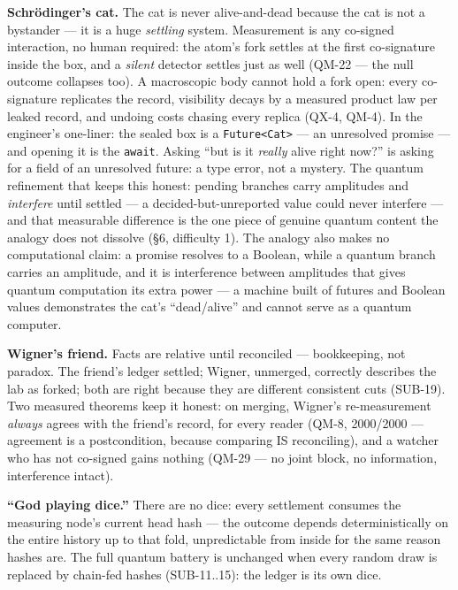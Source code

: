 \documentclass[
  11pt,
]{article}
\begin{document}
\textbf{Schrödinger's cat.} The cat is never alive-and-dead because the
cat is not a bystander --- it is a huge \emph{settling} system.
Measurement is any co-signed interaction, no human required: the atom's
fork settles at the first co-signature inside the box, and a
\emph{silent} detector settles just as well (QM-22 --- the null outcome
collapses too). A macroscopic body cannot hold a fork open: every
co-signature replicates the record, visibility decays by a measured
product law per leaked record, and undoing costs chasing every replica
(QX-4, QM-4). In the engineer's one-liner: the sealed box is a
\texttt{Future\textless{}Cat\textgreater{}} --- an unresolved promise
--- and opening it is the \texttt{await}. Asking ``but is it
\emph{really} alive right now?'' is asking for a field of an unresolved
future: a type error, not a mystery. The quantum refinement that keeps
this honest: pending branches carry amplitudes and \emph{interfere}
until settled --- a decided-but-unreported value could never interfere
--- and that measurable difference is the one piece of genuine quantum
content the analogy does not dissolve (\S{}6, difficulty 1). The analogy
also makes no computational claim: a promise resolves to a Boolean,
while a quantum branch carries an amplitude, and it is interference
between amplitudes that gives quantum computation its extra power --- a
machine built of futures and Boolean values demonstrates the cat's
``dead/alive'' and cannot serve as a quantum computer.

\textbf{Wigner's friend.} Facts are relative until reconciled ---
bookkeeping, not paradox. The friend's ledger settled; Wigner, unmerged,
correctly describes the lab as forked; both are right because they are
different consistent cuts (SUB-19). Two measured theorems keep it
honest: on merging, Wigner's re-measurement \emph{always} agrees with
the friend's record, for every reader (QM-8, 2000/2000 --- agreement is
a postcondition, because comparing IS reconciling), and a watcher who
has not co-signed gains nothing (QM-29 --- no joint block, no
information, interference intact).

\textbf{``God playing dice.''} There are no dice: every settlement
consumes the measuring node's current head hash --- the outcome depends
deterministically on the entire history up to that fold, unpredictable
from inside for the same reason hashes are. The full quantum battery is
unchanged when every random draw is replaced by chain-fed hashes
(SUB-11..15): the ledger is its own dice.
\end{document}
